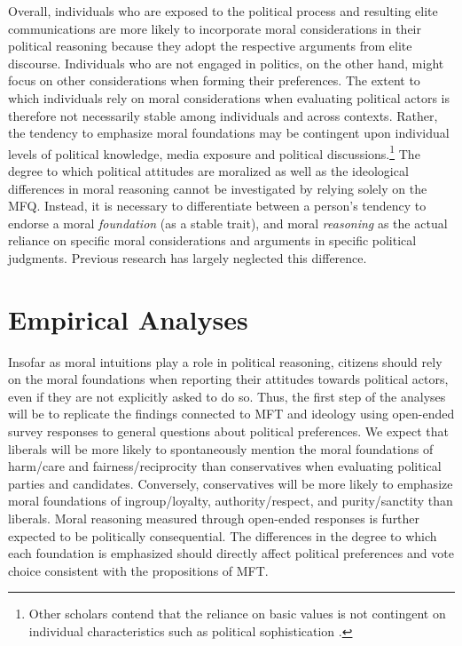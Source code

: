 \documentclass[12pt]{article}
\begin{document}
Overall, individuals who are exposed to the political process and resulting elite communications are more likely to incorporate moral considerations in their political reasoning because they adopt the respective arguments from elite discourse. Individuals who are not engaged in politics, on the other hand, might focus on other considerations when forming their preferences. The extent to which individuals rely on moral considerations when evaluating political actors is therefore not necessarily stable among individuals and across contexts. Rather, the tendency to emphasize moral foundations may be contingent upon individual levels of political knowledge, media exposure and political discussions.\footnote{Other scholars contend that the reliance on basic values is not contingent on individual characteristics such as political sophistication \citep[e.g.][]{feldman1992political,goren2001core,goren2004political,marietta2007values}.} The degree to which political attitudes are moralized as well as the ideological differences in moral reasoning cannot be investigated by relying solely on the MFQ. Instead, it is necessary to differentiate between a person's tendency to endorse a moral \textit{foundation} (as a stable trait), and moral \textit{reasoning} as the actual reliance on specific moral considerations and arguments in specific political judgments. Previous research has largely neglected this difference.


\section{Empirical Analyses}


Insofar as moral intuitions play a role in political reasoning, citizens should rely on the moral foundations when reporting their attitudes towards political actors, even if they are not explicitly asked to do so. Thus, the first step of the analyses will be to replicate the findings connected to MFT and ideology using open-ended survey responses to general questions about political preferences. We expect that liberals will be more likely to spontaneously mention the moral foundations of harm/care and fairness/reciprocity than conservatives when evaluating political parties and candidates. Conversely, conservatives will be more likely to emphasize moral foundations of ingroup/loyalty, authority/respect, and purity/sanctity than liberals. Moral reasoning measured through open-ended responses is further expected to be politically consequential. The differences in the degree to which each foundation is emphasized should directly affect political preferences and vote choice consistent with the propositions of MFT.
\end{document}
